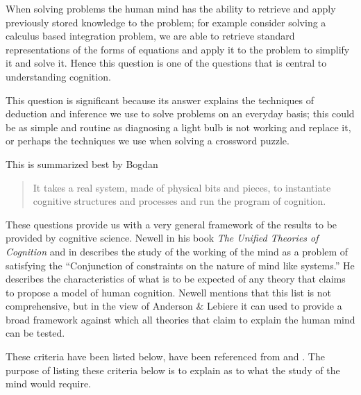 When solving problems the human mind has the ability to
retrieve and apply previously stored knowledge to the problem; for
example consider solving a calculus based integration problem, we are
able to retrieve standard representations of the forms of equations
and apply it to the problem to simplify it and solve it. Hence this
question is one of the questions that is central to understanding
cognition.

This question is significant because its answer explains the
techniques of deduction and inference we use to solve problems on an
everyday basis; this could be as simple and routine as diagnosing a
light bulb is not working and replace it, or perhaps the techniques we
use when solving a crossword puzzle. 

This is summarized best by Bogdan \cite{Bogdan:1993aa}

\begin{quote}
It takes a real system, made of physical bits and pieces, to 
instantiate cognitive structures and processes and run the program of 
cognition.
\end{quote}

These questions provide us with a very general framework of the
results to be provided by cognitive science. Newell in his book
\emph{The Unified Theories of Cognition} \cite{Newell:1990aa} and in
\cite{Newell1980135} describes the study of the working of the mind as
a problem of satisfying the ``Conjunction of constraints on the nature
of mind like systems.'' He describes the characteristics of what is to
be expected of any theory that claims to propose a model of human
cognition. Newell mentions that this list is not comprehensive, but in
the view of Anderson \& Lebiere it can used to provide a broad
framework against which all theories that claim to explain the human
mind can be tested.
 

These criteria have been listed below, have been referenced from
\cite{CambridgeJournals:207162} and \cite{Newell:1990aa}. The purpose
of listing these criteria below is to explain as to what the study of
the mind would require.

